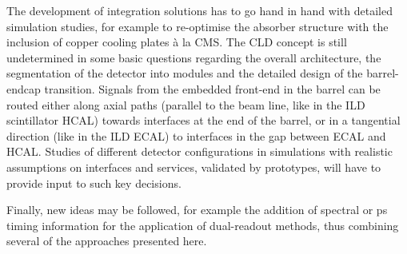 The development of integration solutions has to go hand in hand with detailed simulation studies, for example to re-optimise the absorber structure with the inclusion of copper cooling plates à la CMS. 
The CLD concept is still undetermined in some basic questions regarding the overall architecture, the segmentation of the detector into modules and the detailed design of the barrel-endcap transition.  
Signals from the embedded front-end in the barrel can be routed either along axial paths (parallel to the beam line, like in the ILD scintillator HCAL) towards interfaces at the end of the barrel, or in a tangential direction (like in the ILD ECAL) to interfaces in the gap between ECAL and HCAL.
Studies of different detector configurations in simulations with realistic assumptions on interfaces and services, validated by prototypes, will have to provide input to such key decisions. 

Finally, new ideas may be followed, for example the addition of spectral or ps timing information for the application of dual-readout methods, thus combining several of the approaches presented here. 





